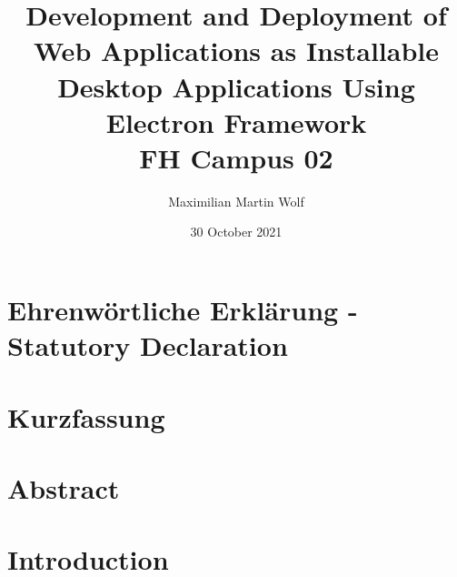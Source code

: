 \documentclass[11pt]{article}
\title{
        {Development and Deployment of Web Applications as Installable Desktop Applications Using
    Electron Framework}\\
    {\large FH Campus 02}\\
}
\author{Maximilian Martin Wolf}
\date{30 October 2021}
\begin{document}
    \renewcommand\thelstlisting{\thesection-\arabic{lstlisting}}

    \titleformat{\section}{\bfseries\sffamily\large\MakeUppercase}{\thesection}{0pt}{\quad}{}%


    \maketitle
    \clearpage

    \setcounter{page}{1}

    \section*{Ehrenwörtliche Erklärung - Statutory Declaration}\label{sec:ehrenwort}
    
    \clearpage
    \section*{Kurzfassung}\label{sec:kurzfassung}
    
    \clearpage
    \section*{Abstract}\label{sec:abstract}
    
    \clearpage

    \tableofcontents
    \clearpage

    \titleformat{\section}{\bfseries\sffamily\large\MakeUppercase}{\thesection}{0pt}{\hspace{9cm}}{}%

    \setcounter{page}{5}

    \section{Introduction}\label{sec:introduction}
    \setcounter{tocdepth}{3}
    
\end{document}
